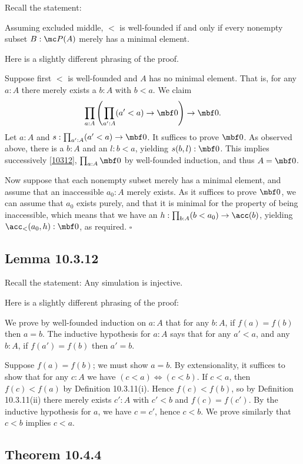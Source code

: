 \documentclass[12pt]{article}
\begin{document}
Recall the statement: 

Assuming excluded middle, $<$ is well-founded if and only if every nonempty subset $B:\mc P(A)$ merely has a minimal element. 

Here is a slightly different phrasing of the proof.

Suppose first $<$ is well-founded and $A$ has no minimal element. That is, for any $a:A$ there merely exists a $b:A$ with $b<a$. We claim 
\begin{equation}\label{10312}
\prod_{a:A}\left(\prod_{a':A}(a'<a)\to\mbf0\right)\to\mbf0.
\end{equation}
Let $a:A$ and $s:\prod_{a':A}(a'<a)\to\mbf0$. It suffices to prove $\mbf0$. As observed above, there is a $b:A$ and an $l:b<a$, yielding $s(b,l):\mbf0$. This implies successively \eqref{10312}, $\prod_{a:A}\mbf0$ by well-founded induction, and thus $A=\mbf0$. 

Now suppose that each nonempty subset merely has a minimal element, and assume that an inaccessible $a_0:A$ merely exists. As it suffices to prove $\mbf0$, we can assume that $a_0$ exists purely, and that it is minimal for the property of being inaccessible, which means that we have an $h:\prod_{b:A}(b<a_0)\to\acc(b)$, yielding $\acc_<(a_0,h):\mbf0$, as required. $\square$


\subsection{Lemma 10.3.12}

Recall the statement: Any simulation is injective.

Here is a slightly different phrasing of the proof:

We prove by well-founded induction on $a:A$ that for any $b:A$, if $f(a)=f(b)$ then $a=b$. The inductive hypothesis for $a:A$ says that for any $a'<a$, and any $b:A$, if $f(a')=f(b)$ then $a'=b$.

Suppose $f(a)=f(b)$; we must show $a=b$. By extensionality, it suffices to show that for any $c:A$ we have $(c<a)\Leftrightarrow(c<b)$. If $c<a$, then $f(c)<f(a)$ by Definition 10.3.11(i). Hence $f(c)<f(b)$, so by Definition 10.3.11(ii) there merely exists $c':A$ with $c'<b$ and $f(c)=f(c')$. By the inductive hypothesis for $a$, we have $c=c'$, hence $c<b$. We prove similarly that $c<b$ implies $c<a$.


\subsection{Theorem 10.4.4}
\end{document}
